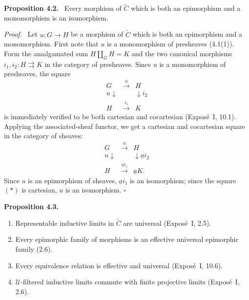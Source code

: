 \documentclass[11pt]{article}
\newcommand{\U}{\mathcal{U}}
\newcommand{\qedtext}{\hfill\(\square\)}
\newenvironment{statement}[1]{\par\medskip\noindent\textbf{#1.}\ }{\par\medskip}
\newenvironment{prooftext}{\par\noindent\emph{Proof.}\ }{\par\medskip}
\begin{document}
\begin{statement}{Proposition 4.2}
Every morphism of \(\widetilde C\) which is both an epimorphism and a monomorphism is an isomorphism.
\end{statement}

\begin{prooftext}
Let \(u:G\to H\) be a morphism of \(\widetilde C\) which is both an epimorphism and a monomorphism. First note that \(u\) is a monomorphism of presheaves (4.1(1)). Form the amalgamated sum \(H\amalg_GH=K\) and the two canonical morphisms \(i_1,i_2:H\rightrightarrows K\) in the category of presheaves. Since \(u\) is a monomorphism of presheaves, the square
\[
\begin{array}{ccc}
G&\xrightarrow{u}&H\\
{\scriptstyle u}\downarrow&&\downarrow{\scriptstyle i_2}\\
H&\xrightarrow{i_1}&K
\end{array}
\]
is immediately verified to be both cartesian and cocartesian (Expos\'e~I, 10.1). Applying the associated-sheaf functor, we get a cartesian and cocartesian square in the category of sheaves:
\[
\begin{array}{ccc}
G&\xrightarrow{u}&H\\
{\scriptstyle u}\downarrow&&\downarrow{\scriptstyle \underline a i_2}\\
H&\xrightarrow{\underline a i_1}&\underline aK.
\end{array}
\tag{*}
\]
Since \(u\) is an epimorphism of sheaves, \(\underline a i_1\) is an isomorphism; since the square \((*)\) is cartesian, \(u\) is an isomorphism. \qedtext
\end{prooftext}

\begin{statement}{Proposition 4.3}
\begin{enumerate}[label=\arabic*)]
\item Representable inductive limits in \(\widetilde C\) are universal (Expos\'e~I, 2.5).
\item Every epimorphic family of morphisms is an effective universal epimorphic family (2.6).
\item Every equivalence relation is effective and universal (Expos\'e~I, 10.6).
\item \(\U\)-filtered inductive limits commute with finite projective limits (Expos\'e~I, 2.6).
\end{enumerate}
\end{statement}
\end{document}
